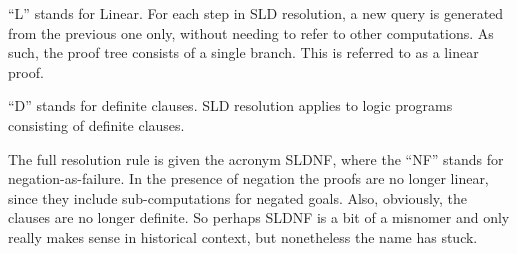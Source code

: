 ``L'' stands for Linear.
For each step in SLD resolution,
a new query is generated from the previous one only,
without needing to refer to other computations.
As such,
the proof tree consists of a single branch.
This is referred to as a linear proof.

``D'' stands for definite clauses.
SLD resolution applies to logic programs
consisting of definite clauses.

The full resolution rule is given the acronym SLDNF,
where the ``NF'' stands for negation-as-failure.
In the presence of negation the proofs are no longer linear,
since they include sub-computations for negated goals.
Also, obviously, the clauses are no longer definite.
So perhaps SLDNF is a bit of a misnomer
and only really makes sense in historical context,
but nonetheless the name has stuck.
